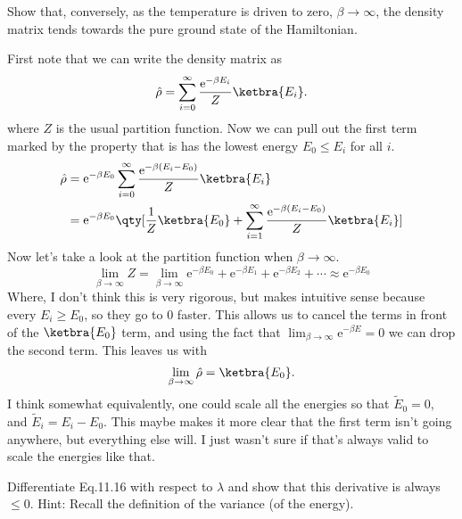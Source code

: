 \documentclass[boxes,pages]{homework}
\makeatletter
\newcommand{\e}{\mathrm{e}}
\numberwithin{@problem}{section}
\makeatother
\begin{document}
\setcounter{section}{11}

\begin{problem}
Show that, conversely, as the temperature is driven to zero, $\beta\to\infty$, the density matrix tends towards the pure ground state of the Hamiltonian.
\end{problem}

\begin{solution}
	First note that we can write the density matrix as
	\begin{equation*}
		\hat{\rho} = \sum_{i = 0}^\infty \frac{\e^{-\beta E_i}}{Z}\ketbra{E_i}.
	\end{equation*}
	where $Z$ is the usual partition function.
	Now we can pull out the first term marked by the property that is has the lowest energy $E_0 \leq E_i$ for all $i$.
	\begin{align}
		\hat{\rho} & = \e^{-\beta E_0}\sum_{i=0}^\infty\frac{\e^{-\beta(E_i - E_0)}}{Z}\ketbra{E_i} \nonumber                                          \\
		           & = \e^{-\beta E_0}\qty[\frac{1}{Z}\ketbra{E_0} + \sum_{i=1}^\infty\frac{\e^{-\beta(E_i - E_0)}}{Z}\ketbra{E_i}] \label{eq:density}
	\end{align}
	Now let's take a look at the partition function when $\beta\to\infty$.
	\begin{equation*}
		\lim_{\beta\to\infty}Z = \lim_{\beta\to\infty}\e^{-\beta E_0} + \e^{-\beta E_1} + \e^{-\beta E_2} + \cdots \approx \e^{-\beta E_0}
	\end{equation*}
	Where, I don't think this is very rigorous, but makes intuitive sense because every $E_i\geq E_0$, so they go to 0 faster.
	This allows us to cancel the terms in front of the $\ketbra{E_0}$ term, and using the fact that $\lim_{\beta\to\infty}\e^{-\beta E} = 0$ we can drop the second term.
	This leaves us with
	\begin{equation*}
		\lim_{\beta\to\infty}\hat{\rho} = \ketbra{E_0}.
	\end{equation*}
	I think somewhat equivalently, one could scale all the energies so that $\tilde{E}_0 = 0$, and $\tilde{E}_i = E_i - E_0$. This maybe makes it more clear that the first term isn't going anywhere, but everything else will. I just wasn't sure if that's always valid to scale the energies like that.
\end{solution}

\begin{problem}
Differentiate Eq.11.16 with respect to $\lambda$ and show that  this derivative is always $\leq 0$. Hint: Recall the definition of the variance (of the energy).
\end{problem}
\end{document}
